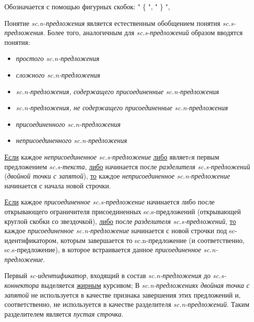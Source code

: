 \begin{SCn}
\end{SCn}

Обозначается с помощью фигурных скобок: " \{ "{}, " \} "{},



Понятие \textit{sc.n-предложения} является естественным обобщением понятия \textit{sc.s-предложения}. Более того, аналогичным для \textit{sc.s-предложений} образом вводятся понятия:
\begin{itemize}
	\item \textit{простого sc.n-предложения}
	\item \textit{сложного sc.n-предложения}
	\item \textit{sc.n-предложения, содержащего присоединенные sc.n-предложения}
	\item \textit{sc.n-предложения, не содержащего присоединенные sc.n-предложения}
	\item \textit{присоединенного sc.n-предложения}
	\item \textit{неприсоединенного sc.n-предложения}
\end{itemize}

\uline{Если} каждое \textit{неприсоединенное sc.s-предложение} \uline{либо} являетcя первым предложением \textit{sc.s-текста}, \uline{либо} начинается после \textit{разделителя sc.s-предложений} (\textit{двойной точки с запятой}), \uline{то} каждое \textit{неприсоединенное sc.n-предложение} начинается с начала новой строчки.

\uline{Если} каждое \textit{присоединенное sc.s-предложение} начинается либо после открывающего ограничителя присоединенных sc.s-предложений (открывающей круглой скобки со звездочкой), \uline{либо} после \textit{разделителя sc.s-предложений}, \uline{то} каждое \textit{присоединенное sc.n-предложение} начинается с новой строчки под sc-идентификатором, которым завершается то sc.n-предложение (и соответственно, sc.s-предложение), в которое встраивается данное \textit{присоединенное sc.n-предложение}.

Первый \textit{sc-идентификатор}, входящий в состав \textit{sc.n-предложения} до \textit{sc.s-коннектора} выделяется \uline{жирным} курсивом;
В \textit{sc.n-предложениях двойная точка с запятой} не используется в качестве признака завершения этих предложений и, соответственно, не используется в качестве разделителя \textit{sc.n-предложений}. Таким разделителем является \textit{пустая строчка}.


